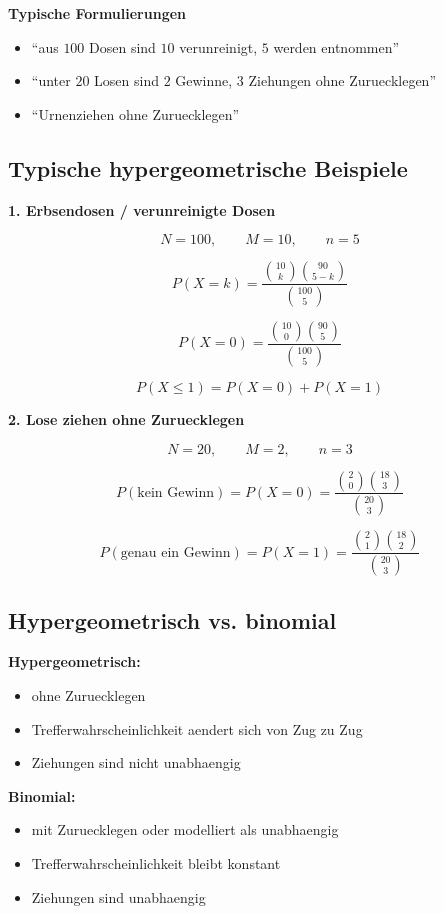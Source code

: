 \documentclass[a4paper,11pt]{article}
\begin{document}
\textbf{Typische Formulierungen}
\begin{itemize}
  \item ``aus $100$ Dosen sind $10$ verunreinigt, $5$ werden entnommen''
  \item ``unter $20$ Losen sind $2$ Gewinne, $3$ Ziehungen ohne Zuruecklegen''
  \item ``Urnenziehen ohne Zuruecklegen''
\end{itemize}

\subsection{Typische hypergeometrische Beispiele}
\textbf{1. Erbsendosen / verunreinigte Dosen}

\[
N=100,\qquad M=10,\qquad n=5
\]

\[
P(X=k)=\frac{\binom{10}{k}\binom{90}{5-k}}{\binom{100}{5}}
\]

\[
P(X=0)=\frac{\binom{10}{0}\binom{90}{5}}{\binom{100}{5}}
\]

\[
P(X\le 1)=P(X=0)+P(X=1)
\]

\textbf{2. Lose ziehen ohne Zuruecklegen}

\[
N=20,\qquad M=2,\qquad n=3
\]

\[
P(\text{kein Gewinn})=P(X=0)=\frac{\binom20\binom{18}{3}}{\binom{20}{3}}
\]

\[
P(\text{genau ein Gewinn})=P(X=1)=\frac{\binom21\binom{18}{2}}{\binom{20}{3}}
\]

\subsection{Hypergeometrisch vs. binomial}
\textbf{Hypergeometrisch:}
\begin{itemize}
  \item ohne Zuruecklegen
  \item Trefferwahrscheinlichkeit aendert sich von Zug zu Zug
  \item Ziehungen sind nicht unabhaengig
\end{itemize}

\textbf{Binomial:}
\begin{itemize}
  \item mit Zuruecklegen oder modelliert als unabhaengig
  \item Trefferwahrscheinlichkeit bleibt konstant
  \item Ziehungen sind unabhaengig
\end{itemize}
\end{document}
